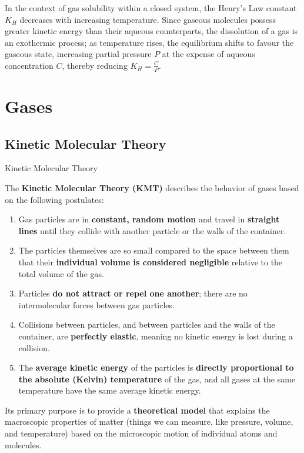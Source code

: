 \documentclass[10pt]{article}
\begin{document}
    In the context of gas solubility within a closed system, the Henry's Law constant $K_{H}$ decreases with increasing temperature. Since gaseous molecules possess greater kinetic energy than their aqueous counterparts, the dissolution of a gas is an exothermic process; as temperature rises, the equilibrium shifts to favour the gaseous state, increasing partial pressure $P$ at the expense of aqueous concentration $C$, thereby reducing $K_{H} = \frac{C}{P}$.
    

\section{Gases}

  \subsection{Kinetic Molecular Theory}

    \begin{core}{Kinetic Molecular Theory}

      The \textbf{Kinetic Molecular Theory (KMT)} describes the behavior of gases based on the following postulates:

      \begin{enumerate}

        \item Gas particles are in \textbf{constant, random motion} and travel in \textbf{straight lines} until they collide with another particle or the walls of the container.

        \item The particles themselves are so small compared to the space between them that their \textbf{individual volume is considered negligible} relative to the total volume of the gas.

        \item Particles \textbf{do not attract or repel one another}; there are no intermolecular forces between gas particles.

        \item Collisions between particles, and between particles and the walls of the container, are \textbf{perfectly elastic}, meaning no kinetic energy is lost during a collision.

        \item The \textbf{average kinetic energy} of the particles is \textbf{directly proportional to the absolute (Kelvin) temperature} of the gas, and all gases at the same temperature have the same average kinetic energy.

      \end{enumerate}

      Its primary purpose is to provide a \textbf{theoretical model} that explains the macroscopic properties of matter (things we can measure, like pressure, volume, and temperature) based on the microscopic motion of individual atoms and molecules.

    \end{core}
   
\end{document}
